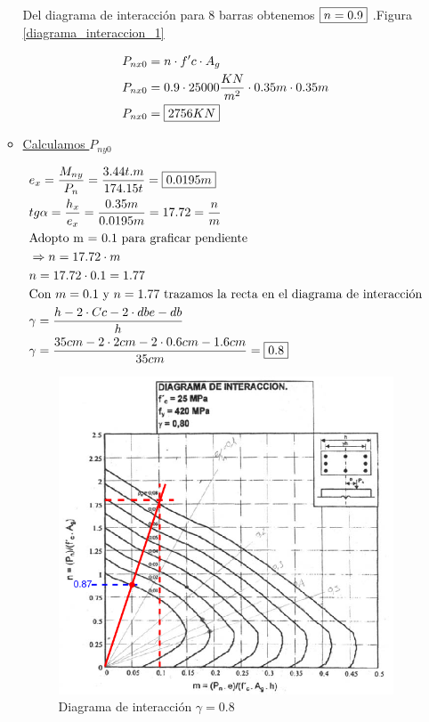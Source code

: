 \begin{enumerate}
\begin{itemize}
Del diagrama de interacción para 8 barras obtenemos $\framebox{$n=0.9$}$ .Figura \ref{diagrama_interaccion_1}

\begin{align*}
& P_{nx0} = n \cdot f'c \cdot A_g\\
& P_{nx0} = 0.9 \cdot 25000 \frac{KN}{m^2} \cdot 0.35m \cdot 0.35m\\
& P_{nx0} = \framebox{$2756 KN$}
\end{align*}

\item \underline{Calculamos $P_{ny0}$}

\begin{align*}
& e_x = \frac{M_{ny}}{P_n} = \frac{3.44 t.m}{174.15 t} = \framebox{$0.0195 m$}\\
& tg \alpha = \frac{h_x}{e_x} = \frac{0.35m}{0.0195m} = 17.72 = \frac{n}{m}\\
& \text{Adopto m = 0.1 para graficar pendiente}\\
& \Rightarrow n = 17.72 \cdot m\\
& n = 17.72 \cdot 0.1 = 1.77\\
& \text{Con } m = 0.1 \text{ y } n = 1.77 \text{ trazamos la recta en el diagrama de interacción}\\
& \gamma = \frac{h - 2 \cdot Cc - 2 \cdot dbe - db}{h}\\
& \gamma = \frac{35cm - 2 \cdot 2cm - 2 \cdot 0.6cm - 1.6cm}{35cm} = \framebox{0.8}
\end{align*}

\begin{figure}[H]
\begin{center}
	 \includegraphics[scale = 0.9]{chapters/chapter_1/images/figura5.png}
     \caption{Diagrama de interacción $\gamma = 0.8$}
     \label{diagrama_interaccion_2}
\end{center}
\end{figure}


\end{itemize}
\end{enumerate}
